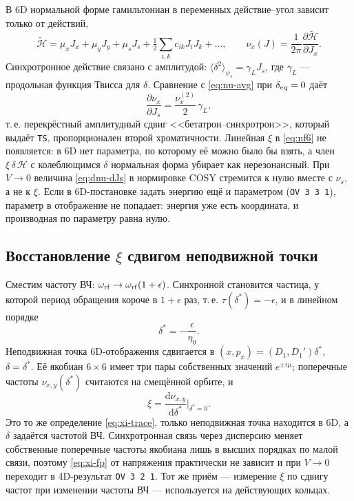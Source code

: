 В 6D нормальной форме гамильтониан в переменных действие--угол зависит только от действий,
\begin{equation}
\label{eq:nf6}
\tilde{\mathcal{H}}=\mu_xJ_x+\mu_yJ_y+\mu_sJ_s
+\tfrac12\sum_{i,k}c_{ik}J_iJ_k+\dots,
\qquad
\nu_x(J)=\frac{1}{2\pi}\frac{\partial\tilde{\mathcal{H}}}{\partial J_x}.
\end{equation}
Синхротронное действие связано с амплитудой: $\langle\delta^2\rangle_{\psi_s}=\gamma_LJ_s$, где $\gamma_L$ --- продольная функция Твисса для $\delta$. Сравнение с \eqref{eq:nu-avg} при $\delta_{\mathrm{eq}}=0$ даёт
\begin{equation}
\label{eq:dnu-dJs}
\frac{\partial\nu_x}{\partial J_s}=\frac{\nu_x^{(2)}}{2}\,\gamma_L,
\end{equation}
т.\,е. перекрёстный амплитудный сдвиг <<бетатрон--синхротрон>>, который выдаёт \texttt{TS}, пропорционален второй хроматичности. Линейная $\xi$ в \eqref{eq:nf6} не появляется: в 6D нет параметра, по которому её можно было бы взять, а член $\xi\,\delta\,\mathcal{H}$ с колеблющимся $\delta$ нормальная форма убирает как нерезонансный. При $V\to0$ величина \eqref{eq:dnu-dJs} в нормировке COSY стремится к нулю вместе с $\nu_s$, а не к $\xi$. Если в 6D-постановке задать энергию ещё и параметром (\texttt{OV 3 3 1}), параметр в отображение не попадает: энергия уже есть координата, и производная по параметру равна нулю.

\subsection{Восстановление $\xi$ сдвигом неподвижной точки}

Сместим частоту ВЧ: $\omega_{\mathrm{rf}}\to\omega_{\mathrm{rf}}(1+\epsilon)$. Синхронной становится частица, у которой период обращения короче в $1+\epsilon$ раз, т.\,е. $\tau(\delta^*)=-\epsilon$, и в линейном порядке
\begin{equation}
\label{eq:dstar}
\delta^*=-\frac{\epsilon}{\eta_0}.
\end{equation}
Неподвижная точка 6D-отображения сдвигается в $(x,p_x)=(D_1,D_1')\delta^*$, $\delta=\delta^*$. Её якобиан $6\times6$ имеет три пары собственных значений $e^{\pm i\mu}$; поперечные частоты $\nu_{x,y}(\delta^*)$ считаются на смещённой орбите, и
\begin{equation}
\label{eq:xi-fp}
\xi=\frac{\mathrm{d}\nu_{x,y}}{\mathrm{d}\delta^*}\Big|_{\delta^*=0}.
\end{equation}
Это то же определение \eqref{eq:xi-trace}, только неподвижная точка находится в 6D, а $\delta$ задаётся частотой ВЧ. Синхротронная связь через дисперсию меняет собственные поперечные частоты якобиана лишь в высших порядках по малой связи, поэтому \eqref{eq:xi-fp} от напряжения практически не зависит и при $V\to0$ переходит в 4D-результат \texttt{OV 3 2 1}. Тот же приём --- измерение $\xi$ по сдвигу частот при изменении частоты ВЧ --- используется на действующих кольцах.

